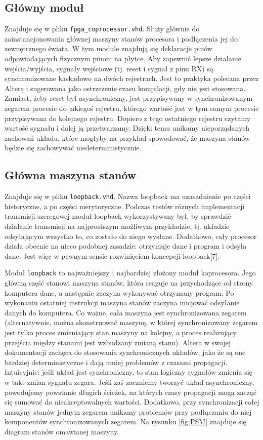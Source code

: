 \subsection{Główny moduł}

Znajduje się w pliku \texttt{fpga\_coprocessor.vhd}. Służy głównie do zainstancjonowania głównej maszyny stanów procesora i podłączenia jej do zewnętrznego świata. W tym module znajdują się deklaracje pinów odpowiadających fizycznym pinom na płytce. Aby zapewnić lepsze działanie wejścia/wyjścia, sygnały wejściowe (tj. reset i sygnał z pinu RX) są synchronizowane kaskadowo na dwóch rejestrach. Jest to praktyka polecana przez Alterę i sugerowana jako ostrzeżenie czasu kompilacji, gdy nie jest stosowana. Zamiast, żeby reset był asynchroniczny, jest przypisywany w synchronizowanym zegarem procesie do jakiegoś rejestru, którego wartość jest w tym samym procesie przypisywana do kolejnego rejestru. Dopiero z tego ostatniego rejestru czytamy wartość sygnału i dalej ją przetwarzamy. Dzięki temu unikamy nieporządanych zachowań układu, które mogłyby na przykład spowodować, że maszyna stanów będzie się zachowywać niedeterministycznie.


\subsection{Główna maszyna stanów}

Znajduje się w pliku \texttt{loopback.vhd}. Nazwa loopback ma uzasadnienie po części historyczne, a po części merytoryczne. Podczas testów różnych implementacji transmisji szeregowej moduł loopback wykorzystywany był, by sprawdzić działanie transmisji na najprostszym możliwym przykładzie, tj. układzie odsyłającym wszystko to, co zostało do niego wysłane. Dodatkowo, cały procesor działa obecnie na nieco podobnej zasadzie: otrzymuje dane i program i odsyła dane. Jest więc w pewnym sensie rozwinięciem koncepcji loopback[7].

Moduł \texttt{loopback} to najważniejszy i najbardziej złożony moduł koprocesora. Jego główną część stanowi maszyna stanów, która reaguje na przychodzące od strony komputera dane, a następnie zaczyna wykonywać otrzymany program. Po wykonaniu ostatniej instrukcji maszyna stanów zaczyna inicjować odsyłanie danych do komputera. Co ważne, cała maszyna jest synchronizowana zegarem (alternatywnie, można skonstruować maszynę, w której synchronizowany zegarem jest tylko proces zmieniający stan maszyny na kolejny, a proces realizujący przejścia między stanami jest wzbudzany zmianą stanu). Altera w swojej dokumentacji zachęca do stosowania synchronicznych układów, jako że są one bardziej deterministyczne i dają mniej problemów z czasami propagacji. Intuicyjnie: jeśli układ jest synchroniczny, to stan logiczny sygnałów zmienia się w takt zmian sygnału zegara. Jeśli zaś zaczniemy tworzyć układ asynchroniczny, powodujemy powstanie długich ścieżek, na których czasy propagacji mogą zacząć się sumować do nieakceptowalnych wartości. Dodatkowo, przy synchronizacji całej maszyny stanów jednym zegarem unikamy problemów przy podłączaniu do niej komponentów synchronizowanych zegarem. Na rysunku \ref{fig:PSM} znajduje się diagram stanów omawianej maszyny. 

